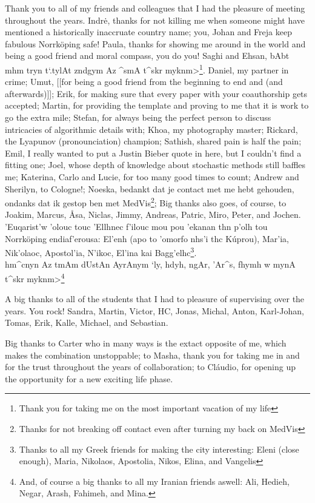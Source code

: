 Thank you to all of my friends and colleagues that I had the pleasure of meeting throughout the years. Indr\.e, thanks for not killing me when someone might have mentioned a historically inaccruate country name; you, Johan and Freja keep fabulous Norrk\"oping safe! Paula, thanks for showing me around in the world and being a good friend and moral compass, you do you! Saghi and Ehsan, \<bAbt mhm tryn t`.tylAt zndgym Az ^smA t^skr myknm>\footnote{Thank you for taking me on the most important vacation of my life}. Daniel, my partner in crime; Umut, [[for being a good friend from the beginning to end and (and afterwards)]]; Erik, for making sure that every paper with your coauthorship gets accepted; Martin, for providing the template and proving to me that it is work to go the extra mile; Stefan, for always being the perfect person to discuss intricacies of algorithmic details with; Khoa, my photography master; Rickard, the Lyapunov (pronounciation) champion; Sathish, shared pain is half the pain; Emil, I really wanted to put a Justin Bieber quote in here, but I couldn't find a fitting one; Joel, whose depth of knowledge about stochastic methods still baffles me; Katerina, Carlo and Lucie, for too many good times to count; Andrew and Sherilyn, to Cologne!; Noeska, bedankt dat je contact met me hebt gehouden, ondanks dat ik gestop ben met MedVis\footnote{Thanks for not breaking off contact even after turning my back on MedVis}; Big thanks also goes, of course, to Joakim, Marcus, \AA sa, Niclas, Jimmy, Andreas, Patric, Miro, Peter, and Jochen. \textgreek{'Euqarist'w 'olouc touc 'Ellhnec f'ilouc mou pou 'ekanan thn p'olh tou} Norrk\"oping \textgreek{endiaf'erousa: El'enh (apo to 'omorfo nhs'i thc K\'uprou), Mar'ia, Nik'olaoc, Apostol'ia, N'ikoc, El'ina kai Bagg'elhc}\footnote{Thanks to all my Greek friends for making the city interesting: Eleni (close enough), Maria, Nikolaos, Apostolia, Nikos, Elina, and Vangelis}.\\ \<hm^cnyn Az tmAm dUstAn AyrAnym `ly, hdyh, ngAr, 'Ar^s, fhymh w mynA t^skr myknm>\footnote{And, of course a big thanks to all my Iranian friends aswell: Ali, Hedieh, Negar, Arash, Fahimeh, and Mina.}

A big thanks to all of the students that I had to pleasure of supervising over the years. You rock! Sandra, Martin, Victor, HC, Jonas, Michal, Anton, Karl-Johan, Tomas, Erik, Kalle, Michael, and Sebastian.

Big thanks to Carter who in many ways is the extact opposite of me, which makes the combination unstoppable; to Masha, thank you for taking me in and for the trust throughout the years of collaboration; to Cl\'audio, for opening up the opportunity for a new exciting life phase.

